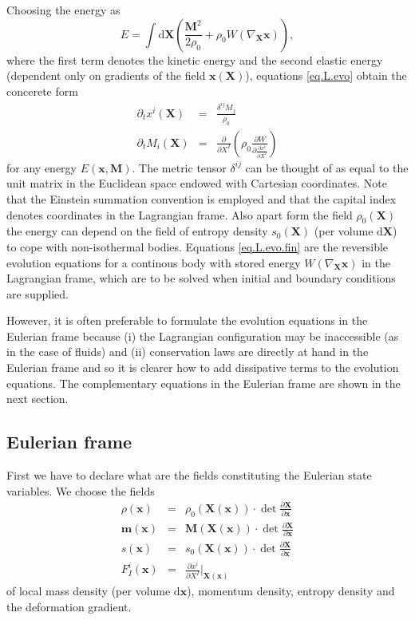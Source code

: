 \documentclass[
10pt, %
a4paper, %
oneside, %
headinclude,footinclude, %
BCOR5mm, %
]{scrartcl}
\newcommand{\xx}{\mathbf{x}}
\newcommand{\XX}{\mathbf{X}}
\newcommand{\dX}{\mathrm{d}\XX}
\newcommand{\dx}{\mathrm{d}\xx}
\newcommand{\mm}{\mathbf{m}}
\newcommand{\MM}{\mathbf{M}}
\begin{document}
Choosing the energy as
\begin{equation}
	E = \int\dX \left(\frac{\MM^2}{2\rho_0} + \rho_0 W(\nabla_\XX \xx)\right),
\end{equation}
where the first term denotes the kinetic energy and the second elastic energy (dependent only on gradients of the field $\xx(\XX)$), equations \eqref{eq.L.evo} obtain the concerete form
\begin{subequations}\label{eq.L.evo.fin}
	\begin{eqnarray}
		\partial_t x^i(\XX) &=& \frac{\delta^{ij} M_j}{\rho_0}\\
		\partial_t M_i(\XX) &=& \frac{\partial}{\partial X^I}\left(\rho_0 \frac{\partial W}{\partial \frac{\partial x^i}{\partial X^I}}\right)
	\end{eqnarray}
\end{subequations}
	for any energy $E(\xx,\MM)$. The metric tensor $\delta^{ij}$ can be thought of as equal to the 
	unit matrix in the Euclidean space endowed with Cartesian coordinates. Note that the Einstein 
	summation convention is employed and that the capital index denotes coordinates in the 
	Lagrangian frame. Also apart form the field $\rho_0(\XX)$ the energy can depend on the field of 
	entropy density $s_0(\XX)$ (per volume $\dX$) to cope with non-isothermal bodies. Equations 
	\eqref{eq.L.evo.fin} are the reversible evolution equations for a continous body with stored 
	energy $W(\nabla_\XX \xx)$ in the Lagrangian frame, which are to be solved when initial and 
	boundary conditions are supplied. 



However, it is often preferable to formulate the evolution equations in the Eulerian frame because (i) the Lagrangian configuration may be inaccessible (as in the case of fluids) and (ii) conservation laws are directly at hand in the Eulerian frame and so it is clearer how to add dissipative terms to the evolution equations. The complementary equations in the Eulerian frame are shown in the next section.

\subsection{Eulerian frame}
First we have to declare what are the fields constituting the Eulerian state variables. We choose the fields
\begin{subequations}\label{eq.x.E}
	\begin{eqnarray}
		\rho(\xx) &=& \rho_0(\XX(\xx)) \cdot \det \frac{\partial \XX}{\partial \xx}\\
		\mm(\xx) &=& \MM(\XX(\xx)) \cdot \det \frac{\partial \XX}{\partial \xx}\\
		s(\xx) &=& s_0(\XX(\xx)) \cdot \det \frac{\partial \XX}{\partial \xx}\\
		F^i_I(\xx) &=& \frac{\partial x^i}{\partial X^I}\Big|_{\XX(\xx)}
	\end{eqnarray}
\end{subequations}
of local mass density (per volume $\dx$), momentum density, entropy density and the deformation gradient. 
\end{document}
